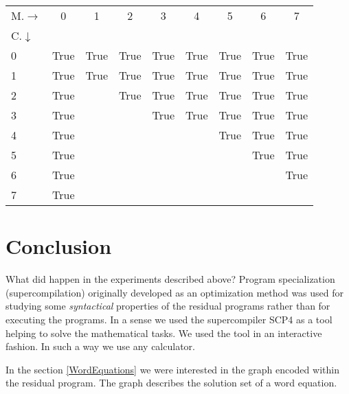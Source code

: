 \documentclass[preprint]{sigplanconf}
\newcommand{\zb}{\hspace{-0.5pt}}
\newcommand{\zbb}{\hspace{-1.0pt}}
\newcommand{\True}{\small{True}}
\begin{document}
\begin{center}
  \begin{tabular}{l|c|c|c|c|c|c|c|c}
    \hfill \zbb\zbb\zb\small{M.\tiny{$\rightarrow$}}  & 0  & 1  & 2  & 3 & 4 & 5 & 6 & 7  \\
    \zbb\zbb\zb\small{C.\tiny{$\downarrow$}}          &    &    &    &   &   &   &   &    \\
    \hline
    0                     & \True & \True & \True & \True & \True & \True & \True & \True \\
    \hline
    1                     & \True & \True & \True & \True & \True & \True & \True & \True \\
    \hline
    2                     & \True &       & \True & \True & \True & \True & \True & \True \\
    \hline
    3                     & \True &       &      & \True & \True & \True & \True & \True \\
    \hline
    4                     & \True &       &      &       &       & \True & \True & \True \\
    \hline
    5                     & \True &       &      &       &       &       & \True & \True \\
    \hline
    6                     & \True &       &      &       &       &       &       & \True \\
    \hline
    7                     & \True &       &      &       &       &       &       &  \\
  \end{tabular}
\end{center}


\section{Conclusion}

What did happen in the experiments described above? Program specialization (supercompilation) originally developed as an optimization method was used for studying some \emph{syntactical} properties of the residual programs rather than for executing the programs. In a sense we used the supercompiler SCP4 as a tool helping to solve the mathematical tasks. We used the tool in an interactive fashion. In such a way we use any calculator. 


In the section \ref{WordEquations} we were interested in the graph encoded 
within the residual program. The graph describes the solution set of a word equation. 
\end{document}
